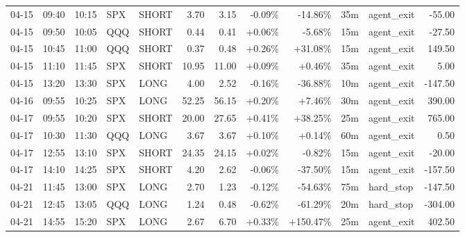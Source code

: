 \documentclass[11pt,a4paper]{article}
\begin{document}
\begin{center}
\begin{longtable}{>{\color{txtmain}}l l l l l r r r r r >{\color{txtmain}}l r}
04-15 & 09:40 & 10:15 & SPX & SHORT & 3.70 & 3.15 & \textcolor{lossred}{-0.09\%} & \textcolor{lossred}{-14.86\%} & 35m & agent\_exit & \textcolor{lossred}{-55.00} \\
04-15 & 09:50 & 10:05 & QQQ & SHORT & 0.44 & 0.41 & \textcolor{wingreen}{+0.06\%} & \textcolor{lossred}{-5.68\%} & 15m & agent\_exit & \textcolor{lossred}{-27.50} \\
04-15 & 10:45 & 11:00 & QQQ & SHORT & 0.37 & 0.48 & \textcolor{wingreen}{+0.26\%} & \textcolor{wingreen}{+31.08\%} & 15m & agent\_exit & \textcolor{wingreen}{149.50} \\
04-15 & 11:10 & 11:45 & SPX & SHORT & 10.95 & 11.00 & \textcolor{wingreen}{+0.09\%} & \textcolor{wingreen}{+0.46\%} & 35m & agent\_exit & \textcolor{wingreen}{5.00} \\
04-15 & 13:20 & 13:30 & SPX & LONG & 4.00 & 2.52 & \textcolor{lossred}{-0.16\%} & \textcolor{lossred}{-36.88\%} & 10m & agent\_exit & \textcolor{lossred}{-147.50} \\
04-16 & 09:55 & 10:25 & SPX & LONG & 52.25 & 56.15 & \textcolor{wingreen}{+0.20\%} & \textcolor{wingreen}{+7.46\%} & 30m & agent\_exit & \textcolor{wingreen}{390.00} \\
04-17 & 09:55 & 10:20 & SPX & SHORT & 20.00 & 27.65 & \textcolor{wingreen}{+0.41\%} & \textcolor{wingreen}{+38.25\%} & 25m & agent\_exit & \textcolor{wingreen}{765.00} \\
04-17 & 10:30 & 11:30 & QQQ & LONG & 3.67 & 3.67 & \textcolor{wingreen}{+0.10\%} & \textcolor{wingreen}{+0.14\%} & 60m & agent\_exit & \textcolor{wingreen}{0.50} \\
04-17 & 12:55 & 13:10 & SPX & SHORT & 24.35 & 24.15 & \textcolor{wingreen}{+0.02\%} & \textcolor{lossred}{-0.82\%} & 15m & agent\_exit & \textcolor{lossred}{-20.00} \\
04-17 & 14:10 & 14:25 & SPX & SHORT & 4.20 & 2.62 & \textcolor{lossred}{-0.06\%} & \textcolor{lossred}{-37.50\%} & 15m & agent\_exit & \textcolor{lossred}{-157.50} \\
04-21 & 11:45 & 13:00 & SPX & LONG & 2.70 & 1.23 & \textcolor{lossred}{-0.12\%} & \textcolor{lossred}{-54.63\%} & 75m & hard\_stop & \textcolor{lossred}{-147.50} \\
04-21 & 12:45 & 13:05 & QQQ & LONG & 1.24 & 0.48 & \textcolor{lossred}{-0.62\%} & \textcolor{lossred}{-61.29\%} & 20m & hard\_stop & \textcolor{lossred}{-304.00} \\
04-21 & 14:55 & 15:20 & SPX & LONG & 2.67 & 6.70 & \textcolor{wingreen}{+0.33\%} & \textcolor{wingreen}{+150.47\%} & 25m & agent\_exit & \textcolor{wingreen}{402.50} \\

\end{longtable}
\end{center}
\end{document}
